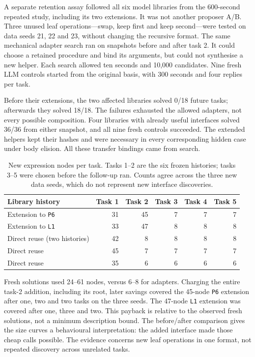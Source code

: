 A separate retention assay followed all six model libraries from the
600-second repeated study, including its two extensions. It was not another
proposer A/B. Three unused leaf operations---swap, keep first and keep
second---were tested on data seeds 21, 22 and 23, without changing the recursive
format. The same mechanical adapter search ran on snapshots before and after
task 2. It could choose a retained procedure and bind its arguments, but could
not synthesise a new helper. Each search allowed ten seconds and 10,000
candidates. Nine fresh LLM controls started from the original basis, with
300 seconds and four replies per task.

Before their extensions, the two affected libraries solved 0/18 future tasks;
afterwards they solved 18/18. The failures exhausted the allowed adapters,
not every possible composition. Four libraries with already useful interfaces
solved 36/36 from either snapshot, and all nine fresh controls succeeded.
The extended helpers kept their hashes and were necessary in every corresponding
hidden case under body elision. All these transfer bindings came from search.

\begin{table}[htbp]
\centering
\small
\begin{tabular}{lrrrrr}
\toprule
Library history & Task 1 & Task 2 & Task 3 & Task 4 & Task 5 \\
\midrule
Extension to \texttt{P6} & 31 & 45 & 7 & 7 & 7 \\
Extension to \texttt{L1} & 33 & 47 & 8 & 8 & 8 \\
Direct reuse (two histories) & 42 & 8 & 8 & 8 & 8 \\
Direct reuse & 45 & 7 & 7 & 7 & 7 \\
Direct reuse & 35 & 6 & 6 & 6 & 6 \\
\bottomrule
\end{tabular}
\caption{New expression nodes per task. Tasks 1--2 are the six frozen
histories; tasks 3--5 were chosen before the follow-up ran. Counts agree across
the three new data seeds, which do not represent new interface discoveries.}
\label{tab:extension-cost}
\end{table}

Fresh solutions used 24--61 nodes, versus 6--8 for adapters. Charging the
entire task-2 addition, including its root, later savings covered the 45-node
\texttt{P6} extension after one, two and two tasks on the three seeds. The
47-node \texttt{L1} extension was covered after one, three and two. This payback
is relative to the observed fresh solutions, not a minimum description bound.
The before/after comparison gives the size curves a behavioural interpretation:
the added interface made those cheap calls possible. The evidence concerns
new leaf operations in one format, not repeated discovery across unrelated tasks.

